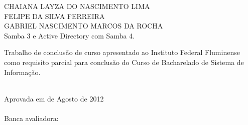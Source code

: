 \begin{folhadeaprovacao}
    \setlength{\ABNTsignthickness}{0.4pt}
    \setlength{\ABNTsignwidth}{15cm}
    \setlength{\ABNTsignskip}{0.9cm}
    \begin{center}
	{\large CHAIANA LAYZA DO NASCIMENTO LIMA} \\
	{\large FELIPE DA SILVA FERREIRA} \\	
	{\large GABRIEL NASCIMENTO MARCOS DA ROCHA} \\ [4cm]
	{\large Samba 3 e Active Directory com Samba 4.}\\ [2cm]
        \hspace{.45\textwidth} %
        \begin{minipage}{0.5\textwidth}
        \begin{espacosimples}
        Trabalho de conclusão de curso apresentado ao Instituto Federal Fluminense como requisito parcial para conclusão do Curso de Bacharelado de Sistema de Informação.\\\\
        \end{espacosimples}
        \end{minipage}
    \end{center}
    Aprovada em  de Agosto de 2012 \\\\
    Banca avaliadora:
\end{folhadeaprovacao}
